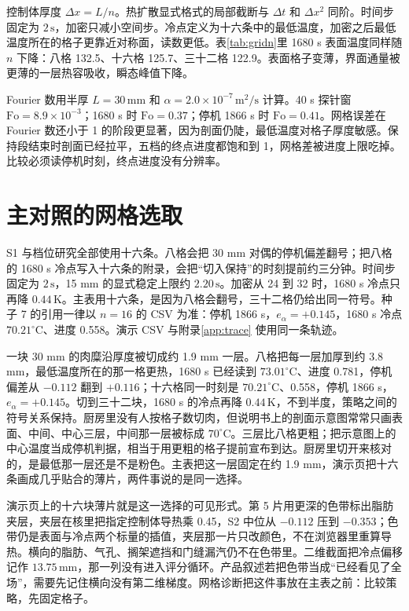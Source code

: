 控制体厚度 \(\Delta x=L/n\)。热扩散显式格式的局部截断与 \(\Delta t\) 和 \(\Delta x^2\) 同阶。时间步固定为 \(2\,\mathrm{s}\)，加密只减小空间步。冷点定义为十六条中的最低温度，加密之后最低温度所在的格子更靠近对称面，读数更低。表\ref{tab:gridn}里 1680 s 表面温度同样随 \(n\) 下降：八格 132.5、十六格 125.7、三十二格 122.9。表面格子变薄，界面通量被更薄的一层热容吸收，瞬态峰值下降。

Fourier 数用半厚 \(L=30\,\mathrm{mm}\) 和 \(\alpha=2.0\times 10^{-7}\,\mathrm{m}^2/\mathrm{s}\) 计算。40 s 探针窗 \(\mathrm{Fo}=8.9\times 10^{-3}\)；1680 s 时 \(\mathrm{Fo}=0.37\)；停机 1866 s 时 \(\mathrm{Fo}=0.41\)。网格误差在 Fourier 数还小于 1 的阶段更显著，因为剖面仍陡，最低温度对格子厚度敏感。保持段结束时剖面已经拉平，五档的终点进度都饱和到 1，网格差被进度上限吃掉。比较必须读停机时刻，终点进度没有分辨率。

\section{主对照的网格选取}

S1 与档位研究全部使用十六条。八格会把 30 mm 对偶的停机偏差翻号；把八格的 1680 s 冷点写入十六条的附录，会把“切入保持”的时刻提前约三分钟。时间步固定为 \(2\,\mathrm{s}\)，15 mm 的显式稳定上限约 \(2.20\,\mathrm{s}\)。加密从 24 到 32 时，1680 s 冷点只再降 \(0.44\,\mathrm{K}\)。主表用十六条，是因为八格会翻号，三十二格仍给出同一符号。种子 7 的引用一律以 \(n=16\) 的 CSV 为准：停机 1866 s，\(e_{\alpha}=+0.145\)，1680 s 冷点 \(70.21^\circ\mathrm{C}\)、进度 0.558。演示 CSV 与附录\ref{app:trace} 使用同一条轨迹。

一块 30 mm 的肉糜沿厚度被切成约 1.9 mm 一层。八格把每一层加厚到约 3.8 mm，最低温度所在的那一格更热，1680 s 已经读到 \(73.01^\circ\mathrm{C}\)、进度 0.781，停机偏差从 \(-0.112\) 翻到 \(+0.116\)；十六格同一时刻是 \(70.21^\circ\mathrm{C}\)、0.558，停机 1866 s，\(e_{\alpha}=+0.145\)。切到三十二块，1680 s 的冷点再降 \(0.44\,\mathrm{K}\)，不到半度，策略之间的符号关系保持。厨房里没有人按格子数切肉，但说明书上的剖面示意图常常只画表面、中间、中心三层，中间那一层被标成 \(70^\circ\mathrm{C}\)。三层比八格更粗；把示意图上的中心温度当成停机判据，相当于用更粗的格子提前宣布到达。厨房里切开来核对的，是最低那一层还是不是粉色。主表把这一层固定在约 1.9 mm，演示页把十六条画成几乎贴合的薄片，两件事说的是同一选择。

演示页上的十六块薄片就是这一选择的可见形式。第 5 片用更深的色带标出脂肪夹层，夹层在核里把指定控制体导热乘 0.45，S2 中位从 \(-0.112\) 压到 \(-0.353\)；色带仍是表面与冷点两个标量的插值，夹层那一片只改颜色，不在浏览器里重算导热。横向的脂肪、气孔、搁架遮挡和门缝漏汽仍不在色带里。二维截面把冷点偏移记作 \(13.75\,\mathrm{mm}\)，那一列没有进入评分循环。产品叙述若把色带当成“已经看见了全场”，需要先记住横向没有第二维梯度。网格诊断把这件事放在主表之前：比较策略，先固定格子。
